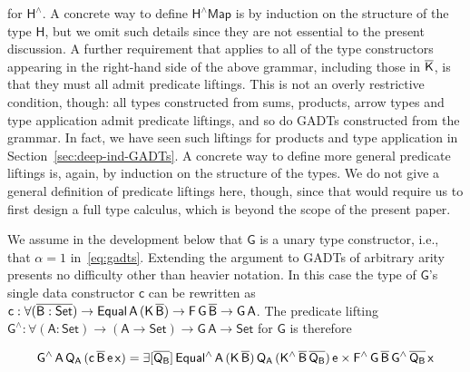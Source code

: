 \documentclass[9pt]{entcs}
\begin{document}
\vspace*{0.05in}

\noindent
for $\mathsf{H^{\wedge}}$. A concrete way to define $\mathsf{H^\wedge
  Map}$ is by induction on the structure of the type $\mathsf{H}$, but
we omit such details since they are not essential to the present
discussion. A further requirement that applies to all of the type
constructors appearing in the right-hand side of the above grammar,
including those in $\overline{\mathsf{K}}$, is that they must all admit
predicate liftings. This is not an overly restrictive condition,
though: all types constructed from sums, products, arrow types and
type application admit predicate liftings, and so do GADTs constructed
from the grammar. In fact, we have seen such liftings for products and
type application in Section~\ref{sec:deep-ind-GADTs}. A concrete way
to define more general predicate liftings is, again, by induction on
the structure of the types. We do not give a general definition of
predicate liftings here, though, since that would require us to first
design a full type calculus, which is beyond the scope of the present
paper.

We assume in the development below that $\mathsf{G}$ is a unary type
constructor, i.e., that $\alpha = 1$ in~\eqref{eq:gadts}. Extending
the argument to GADTs of arbitrary arity presents no difficulty other
than heavier notation. In this case the type of $\mathsf{G}$'s single
data constructor $\mathsf{c}$ can be rewritten as $\mathsf{c : \forall
  (\overline{B : Set}) \to Equal\,A\,(K\,\overline{B}) \to F\,G\,\overline{B} \to
  G\,A}$. The predicate lifting $\mathsf{G^{\wedge} : \forall (A :
  Set) \to (A \to Set) \to G\,A \to Set}$ for $\mathsf{G}$ is
therefore

\vspace*{-0.05in}

\[\mathsf{G^{\wedge}\,A\,Q_A\,(c\,\overline{B}\,e\,x)
= \exists [\overline{Q_B}]\,
Equal^{\wedge}\,A\,(K\,\overline{B})\,Q_A\,(K^{\wedge}\,\overline{B}\,\overline{Q_B})\,e
\times F^{\wedge}\,G\,\overline{B}\,G^{\wedge}\,{\overline{Q_B}}\,x}\]
\end{document}
